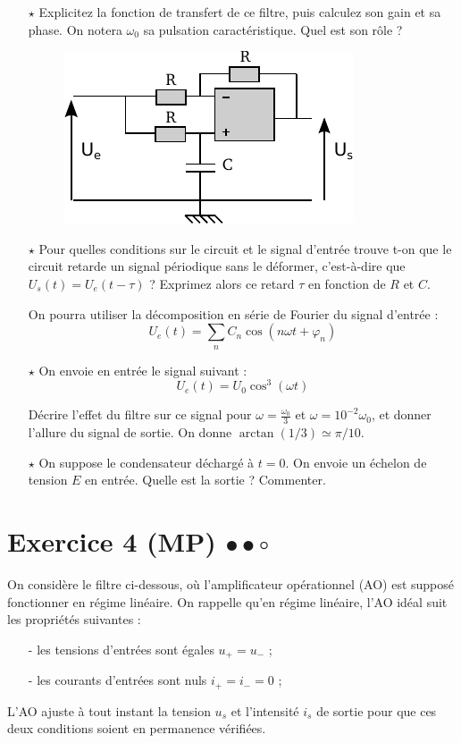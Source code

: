 \documentclass{report}
\begin{document}
\begin{itemize}
\item[$\star$] Explicitez la fonction de transfert de ce filtre, puis calculez son gain et sa phase. On notera $\omega_0$ sa pulsation caractéristique. Quel est son rôle ?
\begin{figure}[!h]
\centering
\includegraphics[width=0.5\linewidth]{circuit_.pdf}
\end{figure}

\item[$\star$]
Pour quelles conditions sur le circuit et le signal d'entrée trouve t-on que le circuit retarde un signal périodique sans le déformer, c'est-à-dire que $U_{s}(t)=U_{e}(t-\tau)$ ? Exprimez alors ce retard $\tau$ en fonction de $R$ et $C$.

On pourra utiliser la décomposition en série de Fourier du signal d'entrée :
\begin{equation}
U_e(t) = \sum_n C_n\cos(n\omega t + \varphi_n)
\end{equation}

\item[$\star$] On envoie en entrée le signal suivant :
\begin{equation}
U_{e}(t) = U_{0}\cos^{3}(\omega t)
\end{equation}

Décrire l'effet du filtre sur ce signal pour $\omega = \frac{\omega_{0}}{3}$ et $\omega=10^{-2}\omega_0$, et donner l'allure du signal de sortie. On donne $\arctan(1/3)\simeq\pi/10$.

\item[$\star$]
On suppose le condensateur déchargé à $t=0$. On envoie un échelon de tension $E$ en entrée. Quelle est la sortie ? Commenter.
\end{itemize}

\newpage

\section*{Exercice 4 (MP) $\bullet\bullet\circ$}

On considère le filtre ci-dessous, où l'amplificateur opérationnel (AO) est supposé fonctionner en régime linéaire. On rappelle qu'en régime linéaire, l'AO idéal suit les propriétés suivantes :
\begin{itemize}
	\item[-] les tensions d'entrées sont égales $u_+=u_-$ ;
	\item[-] les courants d'entrées sont nuls $i_+=i_-=0$ ;
\end{itemize}
L'AO ajuste à tout instant la tension $u_s$ et l'intensité $i_s$ de sortie pour que ces deux conditions soient en permanence vérifiées.
\end{document}
